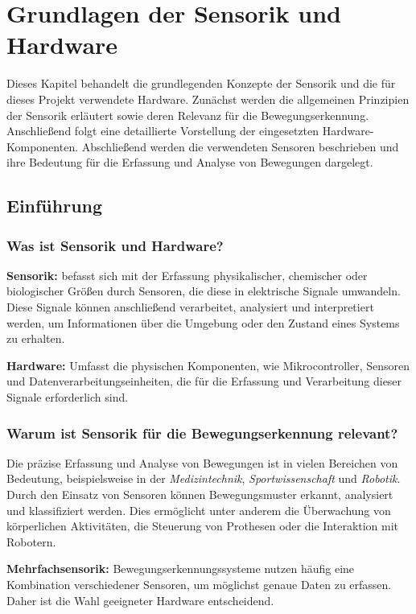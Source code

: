 \chapter{Grundlagen der Sensorik und Hardware}

Dieses Kapitel behandelt die grundlegenden Konzepte der Sensorik und die für dieses Projekt verwendete Hardware. Zunächst werden die allgemeinen Prinzipien der Sensorik erläutert sowie deren Relevanz für die Bewegungserkennung. Anschließend folgt eine detaillierte Vorstellung der eingesetzten Hardware-Komponenten. Abschließend werden die verwendeten Sensoren beschrieben und ihre Bedeutung für die Erfassung und Analyse von Bewegungen dargelegt.

\section{Einführung}
\subsection{Was ist Sensorik und Hardware?}

\textbf{Sensorik:} befasst sich mit der Erfassung physikalischer, chemischer oder biologischer Größen durch Sensoren, die diese in elektrische Signale umwandeln. Diese Signale können anschließend verarbeitet, analysiert und interpretiert werden, um Informationen über die Umgebung oder den Zustand eines Systems zu erhalten.  

\textbf{Hardware:} Umfasst die physischen Komponenten, wie Mikrocontroller, Sensoren und Datenverarbeitungseinheiten, die für die Erfassung und Verarbeitung dieser Signale erforderlich sind.

\subsection{Warum ist Sensorik für die Bewegungserkennung relevant?}

Die präzise Erfassung und Analyse von Bewegungen ist in vielen Bereichen von Bedeutung, beispielsweise in der \emph{Medizintechnik}, \emph{Sportwissenschaft} und \emph{Robotik}. Durch den Einsatz von Sensoren können Bewegungsmuster erkannt, analysiert und klassifiziert werden. Dies ermöglicht unter anderem die Überwachung von körperlichen Aktivitäten, die Steuerung von Prothesen oder die Interaktion mit Robotern.  

\textbf{Mehrfachsensorik:} Bewegungserkennungssysteme nutzen häufig eine Kombination verschiedener Sensoren, um möglichst genaue Daten zu erfassen. Daher ist die Wahl geeigneter Hardware entscheidend.



